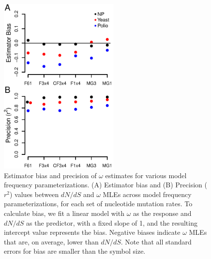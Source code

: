 \documentclass{pnastwo}
\begin{document}
\vspace{2cm}
	

\begin{figure}[htbp]
	\centerline{\includegraphics[width=6cm]{figures/MainText/nyp_bias_r2.pdf}}
	\caption{\label{nyp_bias_r2} Estimator bias and precision of $\omega$ estimates for various model frequency parameterizations. (A) Estimator bias and (B) Precision ($r^2$) values between $dN/dS$ and $\omega$ MLEs across model frequency parameterizations, for each set of nucleotide mutation rates. To calculate bias, we fit a linear model with $\omega$ as the response and $dN/dS$ as the predictor, with a fixed slope of 1, and the resulting intercept value represents the bias. Negative biases indicate $\omega$ MLEs that are, on average, lower than $dN/dS$. Note that all standard errors for bias are smaller than the symbol size.}	
\end{figure}

\vspace{2cm}
\end{document}
